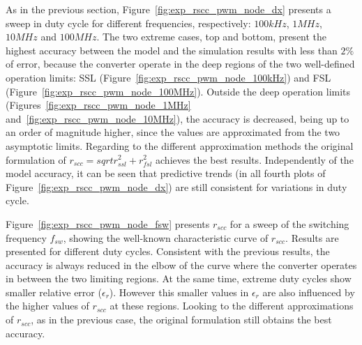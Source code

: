 As in the previous section, Figure~\ref{fig:exp_rscc_pwm_node_dx} presents a sweep in duty cycle for different frequencies, respectively: $100kHz$, $1MHz$, $10MHz$ and $100MHz$. The two extreme cases, top and bottom, present the highest accuracy between the model and the simulation results with less than $2\%$ of error, because the converter operate in the deep regions of the two well-defined operation limits: SSL (Figure~\ref{fig:exp_rscc_pwm_node_100kHz}) and FSL (Figure~\ref{fig:exp_rscc_pwm_node_100MHz}). Outside the deep operation limits (Figures~\ref{fig:exp_rscc_pwm_node_1MHz} and~\ref{fig:exp_rscc_pwm_node_10MHz}), the accuracy is decreased, being  up to an order of magnitude higher, since the values are approximated from the two asymptotic limits. Regarding to the different approximation methods the original formulation of $r_{scc} = sqrt{r_{ssl}^2 + r_{fsl}^2}$ achieves the best results.  Independently of the model accuracy, it can be seen that predictive trends (in all fourth plots of Figure~\ref{fig:exp_rscc_pwm_node_dx}) are still consistent for variations in duty cycle.

Figure~\ref{fig:exp_rscc_pwm_node_fsw} presents $r_{scc}$ for a sweep of the switching frequency $f_{sw}$, showing the well-known characteristic curve of $r_{scc}$. Results are presented  for different duty cycles. Consistent with the previous results, the accuracy is always reduced in the elbow of the curve where the converter operates in between the two limiting regions. At the same time, extreme duty cycles show smaller relative error ($\epsilon_r$). However this smaller values in $\epsilon_r$ are also influenced by the higher values of $r_{scc}$ at these regions.  Looking to the different approximations of $r_{scc}$, as in the previous case, the original formulation still obtains the best accuracy.

